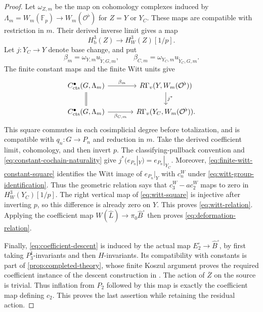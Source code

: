 \documentclass[11pt]{article}
\numberwithin{equation}{section}
\theoremstyle{definition}
\theoremstyle{remark}
\newcommand{\F}{\mathbb F}
\newcommand{\cO}{\mathcal O}
\newcommand{\cts}{\mathrm{cts}}
\begin{document}
\begin{proof}
Let $\omega_{Z,m}$ be the map on cohomology complexes induced by
$\Lambda_m=W_m(\F_p)\to W_m(\cO^\flat)$ for $Z=Y$ or $Y_C$.
These maps are compatible with restriction in $m$.  Their derived
inverse limit gives a map
\[
 H^3_{\mathrm b}(Z)\longrightarrow H_W^3(Z)[1/p].
\]
Let $j:Y_C\to Y$ denote base change, and put
\[
 \beta_m=\omega_{Y,m}u_{\widetilde Y,G,m},\qquad
 \beta_{C,m}=\omega_{Y_C,m}u_{\widetilde Y_C,G,m}.
\]
The finite constant maps and the finite Witt units give
\begin{equation}\label{eq:finite-witt-base-change}
\begin{tikzcd}[column sep=large]
 C_{\cts}^{\bullet}(G,\Lambda_m)
      \arrow[r,"\beta_m"] \arrow[d,equal]
   &R\Gamma_v(Y,W_m(\cO^\flat))\arrow[d,"j^*"]\\
 C_{\cts}^{\bullet}(G,\Lambda_m)
      \arrow[r,"\beta_{C,m}"']
   &R\Gamma_v(Y_C,W_m(\cO^\flat)).
\end{tikzcd}
\end{equation}
This square commutes in each cosimplicial degree before totalization,
and is compatible with $q_n:G\to P_n$ and reduction in $m$.
Take the derived coefficient limit, cohomology, and then invert $p$.
The classifying-pullback convention and
\eqref{eq:constant-cochain-naturality} give
$j^*(e_{P_n}|_Y)=e_{P_n}|_{Y_C}$. Moreover,
\eqref{eq:finite-witt-constant-square} identifies the Witt image of
$e_{P_n}|_Y$ with $c_n^W$ under
\eqref{eq:witt-group-identification}. Thus the geometric relation says
that $c_3^W-a c_2^W$ maps to zero in $H_W^3(Y_C)[1/p]$.
The right vertical map of \eqref{eq:witt-square} is injective after
inverting $p$, so this difference is already zero on $Y$. This proves
\eqref{eq:witt-relation}. Applying the coefficient map
$W(\widehat L)\to\pi_0\widehat B^{\square}$ then proves
\eqref{eq:deformation-relation}.

Finally, \eqref{eq:coefficient-descent} is induced by the actual map
$E_2^{\square}\to\widehat B^{\square}$, by first taking
$P_3^1$-invariants and then $H$-invariants.  Its compatibility with
constants is part of \cref{prop:completed-theory}, whose finite Koszul
argument proves the required coefficient instance of the descent
construction in \cite[Proposition~4.6.12]{BMR2026}.
The action of $\overline Z$ on the source is trivial.  Thus
inflation from $P_2$ followed by this map is exactly the coefficient
map defining $c_2$.  This proves the last assertion while retaining
the residual action.
\end{proof}
\end{document}
